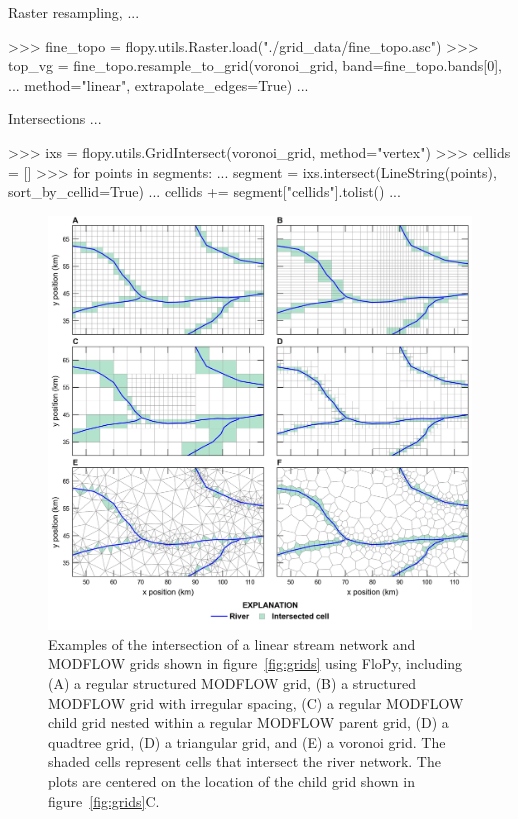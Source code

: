 \documentclass[11pt, oneside]{article}   	%
\begin{document}
Raster resampling, ...

\begin{python}
>>> fine_topo = flopy.utils.Raster.load("./grid_data/fine_topo.asc")
>>> top_vg = fine_topo.resample_to_grid(voronoi_grid, band=fine_topo.bands[0],
... method="linear", extrapolate_edges=True)
...
\end{python}


Intersections ...

\begin{python}
>>> ixs = flopy.utils.GridIntersect(voronoi_grid, method="vertex")
>>> cellids = []
>>> for points in segments:
...     segment = ixs.intersect(LineString(points), sort_by_cellid=True)
...     cellids += segment["cellids"].tolist()
...
\end{python}



\begin{figure}[ht!]
	\begin{center}
		\includegraphics{figures/grids_intersection.png}
	\end{center}
	\caption{Examples of the intersection of a linear stream network and MODFLOW grids shown in figure~\ref{fig:grids} using FloPy, including (A) a regular structured MODFLOW grid, (B) a structured MODFLOW grid with irregular spacing, (C) a regular MODFLOW child grid nested within a regular MODFLOW parent grid, (D) a quadtree grid, (D) a triangular grid, and (E) a voronoi grid. The shaded cells represent cells that intersect the river network. The plots are centered on the location of the child grid shown in figure~\ref{fig:grids}C.}
	\label{fig:intersections}
\end{figure}
\end{document}
